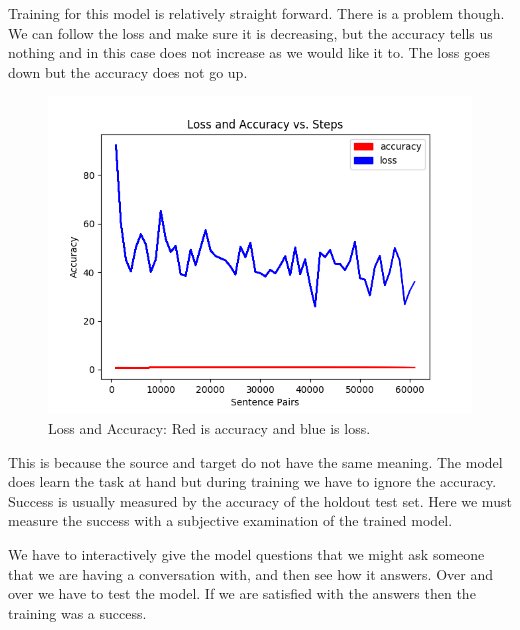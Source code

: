 Training for this model is relatively straight forward. There is a problem though. We can follow the loss and make sure it is decreasing, but the accuracy tells us nothing and in this case does not increase as we would like it to. The loss goes down but the accuracy does not go up.

\begin{figure}[H]
	\begin{center}
	
	\includegraphics[scale=0.5]{Figure_1}
		
\end{center}
	\caption[Loss and Accuracy]{Loss and Accuracy: Red is accuracy and blue is loss.}
	
\end{figure}

This is because the source and target do not have the same meaning. The model does learn the task at hand but during training we have to ignore the accuracy. Success is usually measured by the accuracy of the holdout test set. Here we must measure the success with a subjective examination of the trained model.

We have to interactively give the model questions that we might ask someone that we are having a conversation with, and then see how it answers. Over and over we have to test the model. If we are satisfied with the answers then the training was a success.
